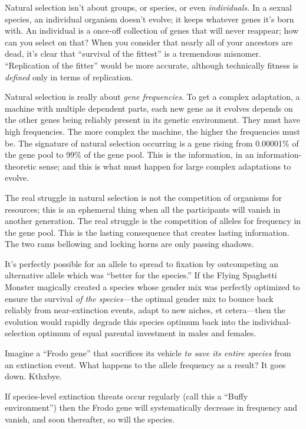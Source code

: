 {
 Natural selection isn't about groups, or species,
or even \textit{individuals.} In a sexual species, an individual
organism doesn't evolve; it keeps whatever genes
it's born with. An individual is a once-off collection
of genes that will never reappear; how can you select on that? When you
consider that nearly all of your ancestors are dead,
it's clear that ``survival of the
fittest'' is a tremendous misnomer.
``Replication of the fitter'' would
be more accurate, although technically fitness is \textit{defined} only
in terms of replication.}

{
 Natural selection is really about \textit{gene frequencies}. To
get a complex adaptation, a machine with multiple dependent parts, each
new gene as it evolves depends on the other genes being reliably
present in its genetic environment. They must have high frequencies.
The more complex the machine, the higher the frequencies must be. The
signature of natural selection occurring is a gene rising from
0.00001\% of the gene pool to 99\% of the gene pool. This is the
information, in an information-theoretic sense; and this is what must
happen for large complex adaptations to evolve.}

{
 The real struggle in natural selection is not the competition of
organisms for resources; this is an ephemeral thing when all the
participants will vanish in another generation. The real struggle is
the competition of alleles for frequency in the gene pool. This is the
lasting consequence that creates lasting information. The two rams
bellowing and locking horns are only passing shadows.}

{
 It's perfectly possible for an allele to spread to
fixation by outcompeting an alternative allele which was
``better for the species.'' If the
Flying Spaghetti Monster magically created a species whose gender mix
was perfectly optimized to ensure the survival \textit{of the
species}{}---the optimal gender mix to bounce back reliably from
near-extinction events, adapt to new niches, et cetera---then the
evolution would rapidly degrade this species optimum back into the
individual-selection optimum of equal parental investment in males and
females.}

{
 Imagine a ``Frodo gene'' that
sacrifices its vehicle \textit{to save its entire species} from an
extinction event. What happens to the allele frequency as a result? It
goes down. Kthxbye.}

{
 If species-level extinction threats occur regularly (call this a
``Buffy environment'') then the
Frodo gene will systematically decrease in frequency and vanish, and
soon thereafter, so will the species.}

